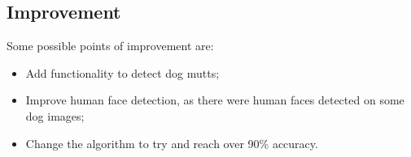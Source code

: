 \documentclass{article}
\begin{document}
    \subsection{Improvement}

    Some possible points of improvement are:

    \begin{itemize}
        \item Add functionality to detect dog mutts;
        \item Improve human face detection, as there were human faces detected on some dog images;
        \item Change the algorithm to try and reach over 90\% accuracy.
    \end{itemize}
\end{document}
